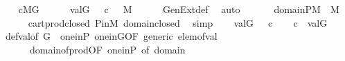 \begin{isabellebody}
\ \ \isamarkupfalse%
\ {\isacartoucheopen}c{\isasymin}M{\isacharbrackleft}{\kern0pt}G{\isacharbrackright}{\kern0pt}{\isacartoucheclose}\isanewline
\ \ \isamarkupfalse%
\ {\isasympi}{\isacharprime}{\kern0pt}\ \ {\isachardoublequoteopen}val{\isacharparenleft}{\kern0pt}G{\isacharcomma}{\kern0pt}\ {\isasympi}{\isacharprime}{\kern0pt}{\isacharparenright}{\kern0pt}\ {\isacharequal}{\kern0pt}\ c{\isachardoublequoteclose}\ {\isachardoublequoteopen}{\isasympi}{\isacharprime}{\kern0pt}\ {\isasymin}\ M{\isachardoublequoteclose}\isanewline
\ \ \ \ \isamarkupfalse%
\ GenExt{\isacharunderscore}{\kern0pt}def\ \isamarkupfalse%
\ auto\isanewline
\ \ \isamarkupfalse%
\isanewline
\ \ \isamarkupfalse%
\ {\isachardoublequoteopen}domain{\isacharparenleft}{\kern0pt}{\isasympi}{\isacharprime}{\kern0pt}{\isacharparenright}{\kern0pt}{\isasymtimes}P{\isasymin}M{\isachardoublequoteclose}\ {\isacharparenleft}{\kern0pt}\ {\isachardoublequoteopen}{\isacharquery}{\kern0pt}{\isasympi}{\isasymin}M{\isachardoublequoteclose}{\isacharparenright}{\kern0pt}\isanewline
\ \ \ \ \isamarkupfalse%
\ cartprod{\isacharunderscore}{\kern0pt}closed\ P{\isacharunderscore}{\kern0pt}in{\isacharunderscore}{\kern0pt}M\ domain{\isacharunderscore}{\kern0pt}closed\ \isamarkupfalse%
\ simp\isanewline
\ \ \isamarkupfalse%
\ {\isacartoucheopen}val{\isacharparenleft}{\kern0pt}G{\isacharcomma}{\kern0pt}\ {\isasympi}{\isacharprime}{\kern0pt}{\isacharparenright}{\kern0pt}\ {\isacharequal}{\kern0pt}\ c{\isacartoucheclose}\isanewline
\ \ \isamarkupfalse%
\ {\isachardoublequoteopen}c\ {\isasymsubseteq}\ val{\isacharparenleft}{\kern0pt}G{\isacharcomma}{\kern0pt}{\isacharquery}{\kern0pt}{\isasympi}{\isacharparenright}{\kern0pt}{\isachardoublequoteclose}\isanewline
\ \ \ \ \isamarkupfalse%
\ def{\isacharunderscore}{\kern0pt}val{\isacharbrackleft}{\kern0pt}of\ G\ {\isacharquery}{\kern0pt}{\isasympi}{\isacharbrackright}{\kern0pt}\ one{\isacharunderscore}{\kern0pt}in{\isacharunderscore}{\kern0pt}P\ one{\isacharunderscore}{\kern0pt}in{\isacharunderscore}{\kern0pt}G{\isacharbrackleft}{\kern0pt}OF\ generic{\isacharbrackright}{\kern0pt}\ elem{\isacharunderscore}{\kern0pt}of{\isacharunderscore}{\kern0pt}val\isanewline
\ \ \ \ \ \ domain{\isacharunderscore}{\kern0pt}of{\isacharunderscore}{\kern0pt}prod{\isacharbrackleft}{\kern0pt}OF\ one{\isacharunderscore}{\kern0pt}in{\isacharunderscore}{\kern0pt}P{\isacharcomma}{\kern0pt}\ of\ {\isachardoublequoteopen}domain{\isacharparenleft}{\kern0pt}{\isasympi}{\isacharprime}{\kern0pt}{\isacharparenright}{\kern0pt}{\isachardoublequoteclose}{\isacharbrackright}{\kern0pt}\ \isamarkupfalse%

\end{isabellebody}
